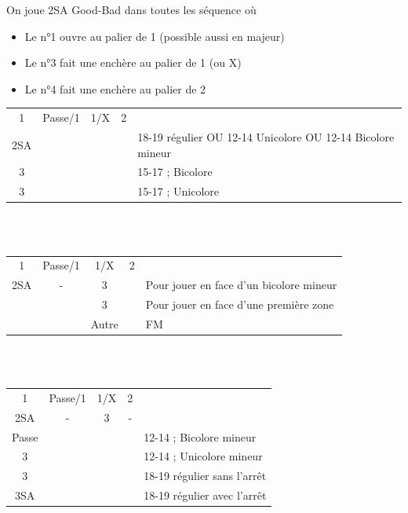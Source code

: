 \documentclass[a4paper, oneside, 11pt]{report}
\begin{document}
\newpage
		On joue 2SA Good-Bad dans toutes les séquence où
		\begin{itemize}
		\item Le n°1 ouvre au palier de 1 (possible aussi en majeur)
		\item Le n°3 fait une enchère au palier de 1 (ou X)
		\item Le n°4 fait une enchère au palier de 2\\
		\end{itemize}
		
		\begin{tabular}{cccc|l}
		1\carreau & Passe/1\coeur & 1\pique/X & 2\coeur &\\
		2SA &&&& 18-19 régulier OU 12-14 Unicolore OU 12-14 Bicolore mineur\\
		3\trefle &&&& 15-17 ; Bicolore\\
		3\carreau &&&& 15-17 ; Unicolore\\
		\end{tabular}\\\\
		
		\begin{tabular}{cccc|l}
		1\carreau & Passe/1\coeur & 1\pique/X & 2\coeur &\\
		2SA & - & 3\trefle && Pour jouer en face d'un bicolore mineur\\
		&& 3\carreau && Pour jouer en face d'une première zone\\
		&& Autre && FM\\
		\end{tabular}\\\\
		
		\begin{tabular}{cccc|l}
		1\carreau & Passe/1\coeur & 1\pique/X & 2\coeur &\\
		2SA & - & 3\trefle & - &\\
		Passe &&&& 12-14 ; Bicolore mineur\\
		3\carreau &&&& 12-14 ; Unicolore mineur\\
		3\coeur &&&& 18-19 régulier sans l'arrêt \coeur\\
		3SA &&&& 18-19 régulier avec l'arrêt \coeur\\
		\end{tabular}\\\\
		
\end{document}
